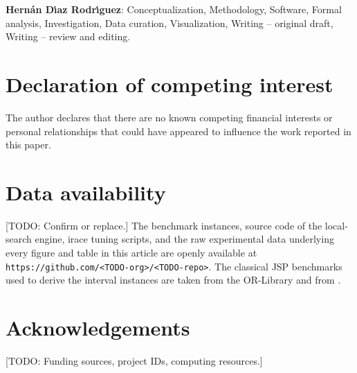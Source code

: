 \documentclass[preprint,12pt]{elsarticle}
\begin{document}
\textbf{Hern\'an D\'{\i}az Rodr\'{\i}guez}: Conceptualization, Methodology, Software, Formal analysis, Investigation, Data curation, Visualization, Writing -- original draft, Writing -- review and editing.


\section*{Declaration of competing interest}

The author declares that there are no known competing financial interests or personal relationships that could have appeared to influence the work reported in this paper.


\section*{Data availability}

[TODO: Confirm or replace.] The benchmark instances, source code of the local-search engine, irace tuning scripts, and the raw experimental data underlying every figure and table in this article are openly available at \texttt{https://github.com/<TODO-org>/<TODO-repo>}. The classical JSP benchmarks used to derive the interval instances are taken from the OR-Library and from \cite{TaillardBKS}.


\section*{Acknowledgements}

[TODO: Funding sources, project IDs, computing resources.]





\end{document}
